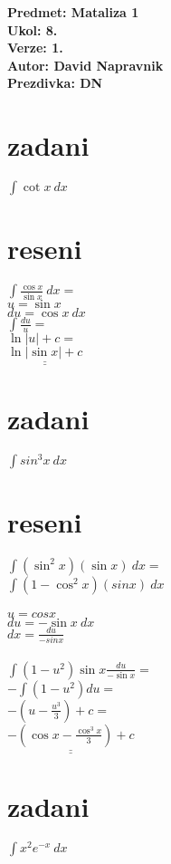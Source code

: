 \documentclass[a4paper]{article}
\def\doubleunderline#1{\underline{\underline{#1}}}
\begin{document}
\noindent
\textbf{Predmet: Mataliza 1}\\
\textbf{Ukol: 8.}\\
\textbf{Verze: 1.}\\
\textbf{Autor: David Napravnik}\\
\textbf{Prezdivka: DN}


\section*{zadani}
$\int \cot x~dx$

\section*{reseni}
$\int \frac{\cos x}{\sin x}~dx=$\\
\indent $u = \sin x$\\
\indent $du = \cos x~dx$\\
$\int \frac{du}{u}=$\\
$\ln |u| + c=$\\
$\doubleunderline{\ln |\sin x| + c}$\\






\section*{zadani}
$\int sin^3 x~dx$

\section*{reseni}
$\int (\sin^2 x)(\sin x)~dx=$\\
$\int (1 - \cos^2 x)(sin x)~dx$
\\\\
$u = cos x$\\
$du = - \sin x~dx$\\
$dx = \frac{du}{-sin x}$
\\\\
$\int (1- u^2) \sin x \frac{du}{- \sin x}=$\\
$-\int (1- u^2) du=$\\
$-(u-\frac{u^3}{3}) +c =$\\
$\doubleunderline{-(\cos x-\frac{\cos^3 x}{3}) + c}$







\section*{zadani}
$\int x^2 e^{-x}~dx$
\end{document}
